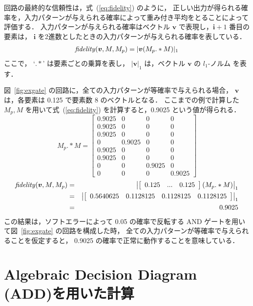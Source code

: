 回路の最終的な信頼性は，式~(\ref{eq:fidelity}) のように，
正しい出力が得られる確率を，入力パターンが与えられる確率によって重み付き平均をとることによって評価する．
入力パターンが与えられる確率はベクトル ${\bm v}$ で表現し，${\bm i} + 1$ 番目の要素は，
${\bm i}$ を2進数としたときの入力パターンが与えられる確率を表している．
\begin{eqnarray}
  {\it fidelity}({\bm v}, M, M_p) = | {\bm v} (M_p .* M) |_{1} \label{eq:fidelity}
\end{eqnarray}
ここで， `$.*$' は要素ごとの乗算を表し， $| {\bm v} |_{1}$ は，ベクトル ${\bm v}$ の $l_1$-ノルム を表す．

図~\ref{fig:exgate} の回路に，全ての入力パターンが等確率で与えられる場合，
${\bm v}$ は，各要素は 0.125 で要素数 8 のベクトルとなる．
ここまでの例で計算した $M_p, M$ を用いて式~(\ref{eq:fidelity}) を計算すると，0.9025 という値が得られる．
\[
  M_p .* M = \left[\begin{array}{cccc}
      0.9025 & 0 & 0 & 0 \\
      0.9025 & 0 & 0 & 0 \\
      0.9025 & 0 & 0 & 0 \\
      0 & 0.9025 & 0 & 0 \\
      0.9025 & 0 & 0 & 0 \\
      0.9025 & 0 & 0 & 0 \\
      0 & 0 & 0.9025 & 0 \\
      0 & 0 & 0 & 0.9025
    \end{array}
  \right]
\]
\begin{eqnarray}
  {\it fidelity}({\bm v}, M, M_p) &=& \left|
  \left[
    \begin{array}{ccc}
      0.125 & ... & 0.125
    \end{array}
  \right] ( M_p .* M )
  \right|_{1} \nonumber \\
  &=& \left| \left[ \begin{array}{cccc}
    0.5640625 & 0.1128125 & 0.1128125 & 0.1128125
  \end{array} \right] \right|_{1} \nonumber \\
  &=& 0.9025 \nonumber
\end{eqnarray}
この結果は，ソフトエラーによって 0.05 の確率で反転する AND ゲートを用いて図~\ref{fig:exgate} の回路を構成した時，
全ての入力パターンが等確率で与えられることを仮定すると， 0.9025 の確率で正常に動作することを意味している．


\section{Algebraic Decision Diagram (ADD)を用いた計算}

